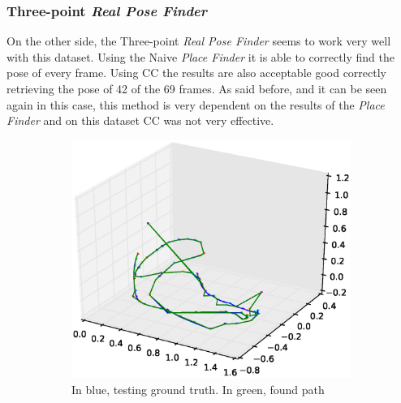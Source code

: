 \subsubsection{Three-point \textit{Real Pose Finder}}
\label{ssub:large_three_point_real_pose_finder}

On the other side, the Three-point \textit{Real Pose Finder} seems to work very well with this dataset. Using the Naive \textit{Place Finder} it is able to correctly find the pose of every frame. Using CC the results are also acceptable good correctly retrieving the pose of 42 of the 69 frames. As said before, and it can be seen again in this case, this method is very dependent on the results of the \textit{Place Finder} and on this dataset CC was not very effective.\\

\begin{figure}[htpb]
  \begin{subfigure}[b]{6cm}
          \includegraphics[width=\linewidth]{img/large_desktop/naive_3pt_path.eps}
          \caption{In blue, testing ground truth. In green, found path}                
          \label{fig:desktop_2_ferns_path_1}
  \end{subfigure}   
  \qquad
  \begin{subfigure}[b]{6cm}

\end{subfigure}
\end{figure}
